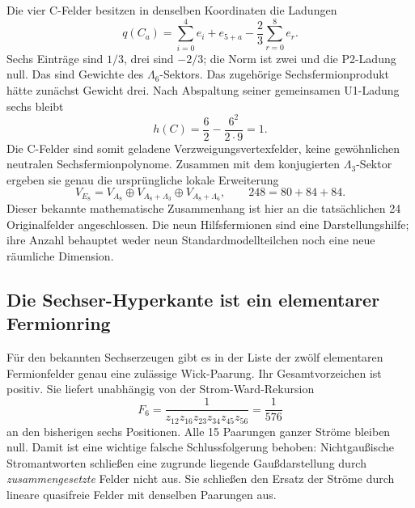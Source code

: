 Die vier C-Felder besitzen in denselben Koordinaten die Ladungen
\begin{equation}\label{eq:Csu9}
q(C_a)=\sum_{i=0}^4e_i+e_{5+a}-\frac23\sum_{r=0}^8e_r.
\end{equation}
Sechs Einträge sind $1/3$, drei sind $-2/3$; die Norm ist zwei und die P2-Ladung null. Das sind Gewichte des $\Lambda_6$-Sektors. Das zugehörige Sechsfermionprodukt hätte zunächst Gewicht drei. Nach Abspaltung seiner gemeinsamen U1-Ladung sechs bleibt
\begin{equation}
h(C)=\frac62-\frac{6^2}{2\cdot9}=1.
\end{equation}
Die C-Felder sind somit geladene Verzweigungsvertexfelder, keine gewöhnlichen neutralen Sechsfermionpolynome. Zusammen mit dem konjugierten $\Lambda_3$-Sektor ergeben sie genau die ursprüngliche lokale Erweiterung
\begin{equation}
V_{E_8}=V_{A_8}\oplus V_{A_8+\Lambda_3}\oplus V_{A_8+\Lambda_6},
\qquad248=80+84+84.
\end{equation}
Dieser bekannte mathematische Zusammenhang \cite{distler} ist hier an die tatsächlichen 24 Originalfelder angeschlossen. Die neun Hilfsfermionen sind eine Darstellungshilfe; ihre Anzahl behauptet weder neun Standardmodellteilchen noch eine neue räumliche Dimension.

\subsection{Die Sechser-Hyperkante ist ein elementarer Fermionring}
Für den bekannten Sechserzeugen gibt es in der Liste der zwölf elementaren Fermionfelder genau eine zulässige Wick-Paarung. Ihr Gesamtvorzeichen ist positiv. Sie liefert unabhängig von der Strom-Ward-Rekursion
\begin{equation}
F_6=\frac1{z_{12}z_{16}z_{23}z_{34}z_{45}z_{56}}=\frac1{576}
\end{equation}
an den bisherigen sechs Positionen. Alle 15 Paarungen ganzer Ströme bleiben null. Damit ist eine wichtige falsche Schlussfolgerung behoben: Nichtgaußische Stromantworten schließen eine zugrunde liegende Gaußdarstellung durch \emph{zusammengesetzte} Felder nicht aus. Sie schließen den Ersatz der Ströme durch lineare quasifreie Felder mit denselben Paarungen aus.


